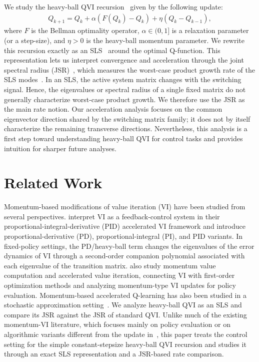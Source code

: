 \documentclass[letterpaper]{article}
\numberwithin{equation}{section}
\begin{document}
We study the heavy-ball QVI recursion~\citep{farahmand2021pid,goyal2022firstorder,weng2019momentum} given by the following update:
\begin{align}
  Q_{k+1}=Q_k+\alpha(F(Q_k)-Q_k)+\eta(Q_k-Q_{k-1}),
  \label{eq:intro-hb-update}
\end{align}
where $F$ is the Bellman optimality operator, $\alpha\in (0,1]$ is a
relaxation parameter (or a step-size), and $\eta>0$ is the heavy-ball momentum parameter. We
rewrite this recursion exactly as an SLS~\citep{liberzon2003switching,lin2009stability,shorten2007stability}
around the optimal Q-function. This representation lets us interpret convergence
and acceleration through the joint spectral radius (JSR)~\citep{rota1960note,jungers2009joint},
which measures the worst-case product growth rate of the SLS
modes~\citep{jungers2009joint,liberzon2003switching}.
In an SLS, the active system matrix changes with the switching signal. Hence,
the eigenvalues or spectral radius of a single fixed matrix do not generally
characterize worst-case product growth. We therefore use the JSR as the main
rate notion. Our acceleration analysis focuses on the common eigenvector
direction shared by the switching matrix family; it does not by itself
characterize the remaining transverse directions. Nevertheless, this analysis is
a first step toward understanding heavy-ball QVI for control tasks and provides
intuition for sharper future analyses.


\section{Related Work}
\label{sec:related_works}


Momentum-based modifications of value iteration (VI) have been studied from
several perspectives. \citet{farahmand2021pid} interpret VI as a feedback-control system in their proportional-integral-derivative (PID) accelerated VI framework and introduce proportional-derivative (PD), proportional-integral (PI), and PID variants. In fixed-policy settings, the PD/heavy-ball term changes the eigenvalues of the error dynamics of VI through a second-order companion polynomial associated with each eigenvalue of the transition matrix. \citet{goyal2022firstorder} also study momentum value computation and accelerated value iteration, connecting VI with first-order optimization methods and analyzing momentum-type VI updates for policy evaluation. Momentum-based accelerated Q-learning has also been studied in a stochastic approximation setting~\citep{weng2019momentum,bowen2021finitetime}. We analyze heavy-ball QVI as an SLS and compare its JSR against the JSR of standard QVI. Unlike much of the existing momentum-VI literature, which focuses mainly on policy evaluation or on algorithmic variants different from the update in~, this paper treats the control setting for the simple constant-stepsize heavy-ball QVI recursion and studies it through an exact SLS representation and a JSR-based rate comparison.
\end{document}
